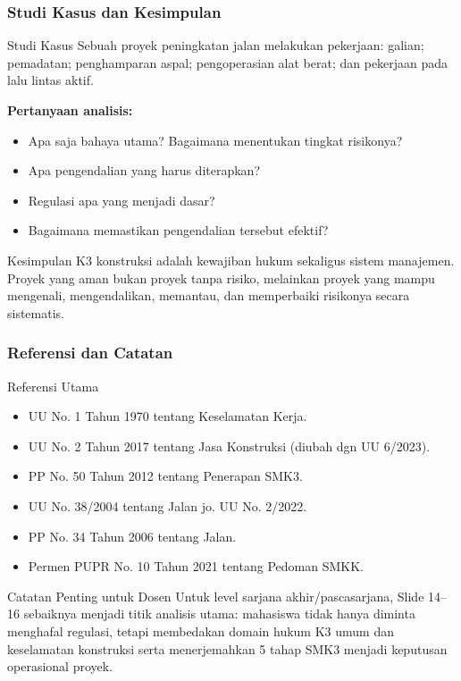 \documentclass[../main.tex]{subfiles}
\begin{document}
\begin{frame}[mytitle=standard,t,mycolor=digiPH_creamy!15]
	\frametitle{Studi Kasus dan Kesimpulan}

	\begin{block}{Studi Kasus}
		Sebuah proyek peningkatan jalan melakukan pekerjaan: galian; pemadatan; penghamparan aspal; pengoperasian alat berat; dan pekerjaan pada lalu lintas aktif.

		\textbf{Pertanyaan analisis:}
		\begin{itemize}
			\item Apa saja bahaya utama? Bagaimana menentukan tingkat risikonya?
			\item Apa pengendalian yang harus diterapkan?
			\item Regulasi apa yang menjadi dasar?
			\item Bagaimana memastikan pengendalian tersebut efektif?
		\end{itemize}
	\end{block}

	\begin{exampleblock}{Kesimpulan}
		K3 konstruksi adalah kewajiban hukum sekaligus sistem manajemen. Proyek yang aman bukan proyek tanpa risiko, melainkan proyek yang mampu mengenali, mengendalikan, memantau, dan memperbaiki risikonya secara sistematis.
	\end{exampleblock}
\end{frame}

\begin{frame}[mytitle=standard,t,mycolor=white]
	\frametitle{Referensi dan Catatan}

	\begin{block}{Referensi Utama}
		\begin{itemize}
			\item UU No. 1 Tahun 1970 tentang Keselamatan Kerja.
			\item UU No. 2 Tahun 2017 tentang Jasa Konstruksi (diubah dgn UU 6/2023).
			\item PP No. 50 Tahun 2012 tentang Penerapan SMK3.
			\item UU No. 38/2004 tentang Jalan jo. UU No. 2/2022.
			\item PP No. 34 Tahun 2006 tentang Jalan.
			\item Permen PUPR No. 10 Tahun 2021 tentang Pedoman SMKK.
		\end{itemize}
	\end{block}

	\begin{alertblock}{Catatan Penting untuk Dosen}
		Untuk level sarjana akhir/pascasarjana, Slide 14–16 sebaiknya menjadi titik analisis utama: mahasiswa tidak hanya diminta menghafal regulasi, tetapi membedakan domain hukum K3 umum dan keselamatan konstruksi serta menerjemahkan 5 tahap SMK3 menjadi keputusan operasional proyek.
	\end{alertblock}
\end{frame}



\end{document}
